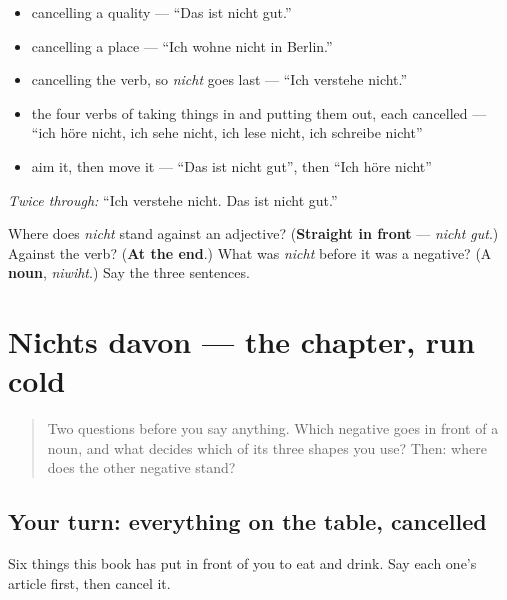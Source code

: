 \begin{itemize}
\raggedright
  \item cancelling a quality — \textquotedblleft{}Das ist nicht gut.\textquotedblright{}
  \item cancelling a place — \textquotedblleft{}Ich wohne nicht in Berlin.\textquotedblright{}
  \item cancelling the verb, so \emph{nicht} goes last — \textquotedblleft{}Ich verstehe nicht.\textquotedblright{}
  \item the four verbs of taking things in and putting them out, each cancelled — \textquotedblleft{}ich höre nicht, ich sehe nicht, ich lese nicht, ich schreibe nicht\textquotedblright{}
  \item aim it, then move it — \textquotedblleft{}Das ist nicht gut\textquotedblright{}, then \textquotedblleft{}Ich höre nicht\textquotedblright{}
\end{itemize}

\emph{Twice through:} \textquotedblleft{}Ich verstehe nicht. Das ist nicht gut.\textquotedblright{}

\begin{tcolorbox}[breakable,colback=teal!4,colframe=teal!35!black,title={Before you move on}]
Where does \emph{nicht} stand against an adjective? (\textbf{Straight in front} — \emph{nicht gut}.) Against the verb? (\textbf{At the end}.) What was \emph{nicht} before it was a negative? (A \textbf{noun}, \emph{niwiht}.) Say the three sentences.
\end{tcolorbox}
\section[Practice]{Nichts davon — the chapter, run cold}

\label{lesson:GE-R32-nichts-davon}



\begin{quote}
Two questions before you say anything. Which negative goes in front of a noun, and what decides which of its three shapes you use? Then: where does the other negative stand?
\end{quote}

\subsection*{Your turn: everything on the table, cancelled}
Six things this book has put in front of you to eat and drink. Say each one's article first, then cancel it.


